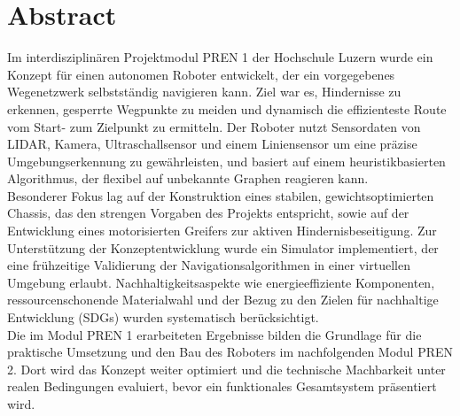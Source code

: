 \documentclass[main.tex]{subfiles} %
\begin{document}
\section*{Abstract}

Im interdisziplinären Projektmodul PREN 1 der Hochschule Luzern wurde ein Konzept 
für einen autonomen Roboter entwickelt, der ein vorgegebenes Wegenetzwerk selbstständig 
navigieren kann. Ziel war es, Hindernisse zu 
erkennen, gesperrte Wegpunkte zu meiden und dynamisch die effizienteste Route vom 
Start- zum Zielpunkt zu ermitteln. Der Roboter nutzt Sensordaten von LIDAR, Kamera,
Ultraschallsensor und einem Liniensensor um eine präzise Umgebungserkennung zu gewährleisten, und 
basiert auf einem heuristikbasierten Algorithmus, der flexibel auf unbekannte 
Graphen reagieren kann.\\

Besonderer Fokus lag auf der Konstruktion eines stabilen, gewichtsoptimierten Chassis, 
das den strengen Vorgaben des Projekts entspricht, sowie auf der Entwicklung eines 
motorisierten Greifers zur aktiven Hindernisbeseitigung. Zur Unterstützung der 
Konzeptentwicklung wurde ein Simulator implementiert, der eine frühzeitige Validierung 
der Navigationsalgorithmen in einer virtuellen Umgebung erlaubt. 
Nachhaltigkeitsaspekte wie energieeffiziente Komponenten, ressourcenschonende 
Materialwahl und der Bezug zu den Zielen für nachhaltige Entwicklung (SDGs) wurden 
systematisch berücksichtigt.\\

Die im Modul PREN 1 erarbeiteten Ergebnisse bilden die Grundlage für die praktische 
Umsetzung und den Bau des Roboters im nachfolgenden Modul PREN 2. Dort wird das 
Konzept weiter optimiert und die technische Machbarkeit unter realen Bedingungen 
evaluiert, bevor ein funktionales Gesamtsystem präsentiert wird.
\end{document}
